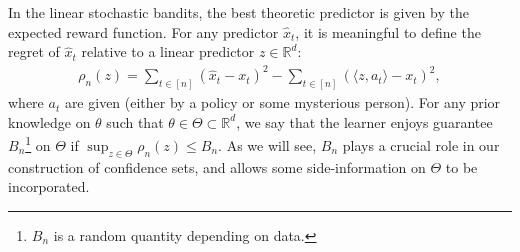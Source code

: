 \documentclass[10pt,a4article]{amsart}
\numberwithin{equation}{section}
\theoremstyle{plain}
\theoremstyle{definition}
\def\R{{\mathbb R}}
\def\R{{\mathbb R}}
\def\t{{\theta}}
\begin{document}
In the linear stochastic bandits, the best theoretic predictor is given by the expected reward function. For any predictor $\hat{x}_t$, it is meaningful to define the regret of $\hat{x}_t$ relative to a linear predictor $z\in\R^d$:
\begin{align*}
\rho_n(z) = \sum_{t\in [n]}(\hat{x}_t-x_t)^2-\sum_{t\in [n]}(\langle z, a_t\rangle-x_t)^2,
\end{align*}
where $a_t$ are given (either by a policy or some mysterious person). For any prior knowledge on $\t$ such that $\t\in\Theta\subset\R^d$, we say that the learner enjoys guarantee $B_n$\footnote{$B_n$ is a random quantity depending on data.} on $\Theta$ if $\sup_{z\in\Theta}\rho_n(z)\leq B_n$. As we will see, $B_n$ plays a crucial role in our construction of confidence sets, and allows some side-information on $\Theta$ to be incorporated.  
\end{document}
